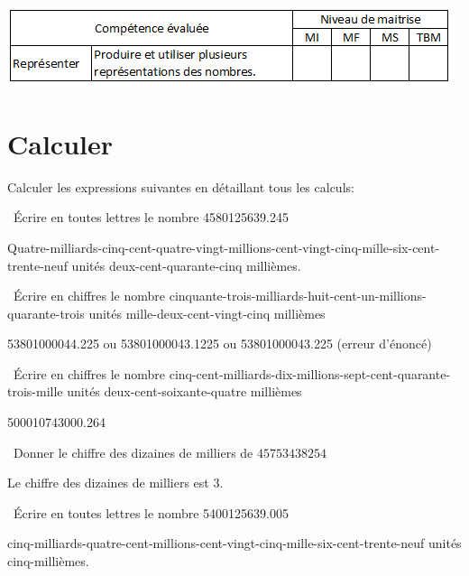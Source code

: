 	\includegraphics[scale=0.95]{competences}
	
	\section{Calculer}
	Calculer les expressions suivantes en détaillant tous les calculs:
	\begin{questions}
		
	
		\question[1]  \'Ecrire en toutes lettres le nombre \num{4580125639.245}
		
		
		\begin{solution}
			Quatre-milliards-cinq-cent-quatre-vingt-millions-cent-vingt-cinq-mille-six-cent-trente-neuf unités deux-cent-quarante-cinq millièmes.
		\end{solution}	 
		
		\question[1]  \'Ecrire en chiffres le nombre cinquante-trois-milliards-huit-cent-un-millions-quarante-trois unités mille-deux-cent-vingt-cinq millièmes
		
		\begin{solution}
			\num{53801000044,225} ou \num{53801000043,1225} ou \num{53801000043,225} (erreur d'énoncé)
		\end{solution}
			
		
		\question[1]  \'Ecrire en chiffres le nombre cinq-cent-milliards-dix-millions-sept-cent-quarante-trois-mille unités deux-cent-soixante-quatre millièmes
		
		\begin{solution}
			\num{500010743000.264}
		\end{solution}
		
		\question[1]  Donner le chiffre des dizaines de milliers de $\num{45753438254}$
		
		\begin{solution}
			Le chiffre des dizaines de milliers est 3.
		\end{solution}
		
		\question[1]  \'Ecrire en toutes lettres le nombre \num{5400125639.005}
		
		\begin{solution}
			cinq-milliards-quatre-cent-millions-cent-vingt-cinq-mille-six-cent-trente-neuf unités cinq-millièmes.
		\end{solution}
		\newpage
		

\end{questions}
